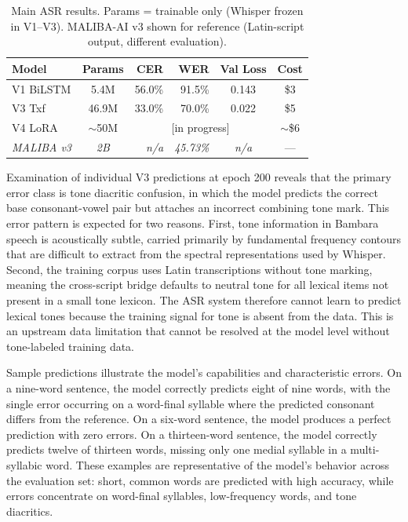 \documentclass[11pt]{article}
\begin{document}
\begin{table}[t]
\centering
\small
\caption{Main ASR results. Params = trainable only (Whisper frozen in V1--V3). MALIBA-AI v3 shown for reference (Latin-script output, different evaluation).}
\label{tab:main_results}
\begin{tabular}{@{}lcrrcc@{}}
\toprule
Model & Params & CER & WER & Val Loss & Cost \\
\midrule
V1 BiLSTM & 5.4M & 56.0\% & 91.5\% & 0.143 & \$3 \\
V3 Txf & 46.9M & 33.0\% & 70.0\% & 0.022 & \$5 \\
V4 LoRA & $\sim$50M & \multicolumn{3}{c}{[in progress]} & $\sim$\$6 \\
\emph{MALIBA v3} & \emph{2B} & \emph{n/a} & \emph{45.73\%} & \emph{n/a} & --- \\
\bottomrule
\end{tabular}
\end{table}

Examination of individual V3 predictions at epoch 200 reveals that the primary error class is tone diacritic confusion, in which the model predicts the correct base consonant-vowel pair but attaches an incorrect combining tone mark. This error pattern is expected for two reasons. First, tone information in Bambara speech is acoustically subtle, carried primarily by fundamental frequency contours that are difficult to extract from the spectral representations used by Whisper. Second, the training corpus uses Latin transcriptions without tone marking, meaning the cross-script bridge defaults to neutral tone for all lexical items not present in a small tone lexicon. The ASR system therefore cannot learn to predict lexical tones because the training signal for tone is absent from the data. This is an upstream data limitation that cannot be resolved at the model level without tone-labeled training data.

Sample predictions illustrate the model's capabilities and characteristic errors. On a nine-word sentence, the model correctly predicts eight of nine words, with the single error occurring on a word-final syllable where the predicted consonant differs from the reference. On a six-word sentence, the model produces a perfect prediction with zero errors. On a thirteen-word sentence, the model correctly predicts twelve of thirteen words, missing only one medial syllable in a multi-syllabic word. These examples are representative of the model's behavior across the evaluation set: short, common words are predicted with high accuracy, while errors concentrate on word-final syllables, low-frequency words, and tone diacritics.
\end{document}
